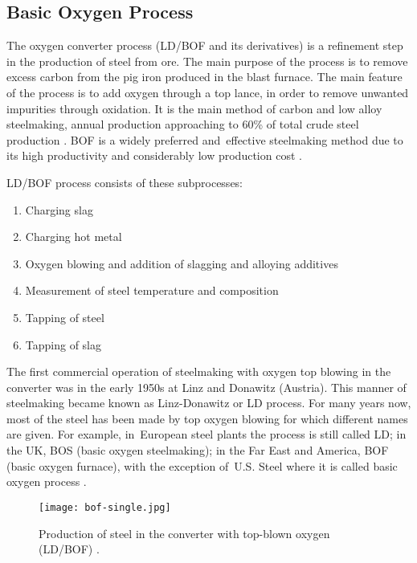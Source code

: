 \subsection{Basic Oxygen Process}

The oxygen converter process (LD/BOF and its derivatives) is a refinement step in the production of steel from ore. The main purpose of the process is to remove excess carbon from the pig iron produced in the blast furnace. The main feature of the process is to add oxygen through a top lance, in order to remove unwanted impurities through oxidation. It is the main method of carbon and low alloy steelmaking, annual production approaching to 60\% of total crude steel production \citep{Jalkanen2006}. BOF is a widely preferred and~effective steelmaking method due to its high productivity and considerably low production cost \citep{Wang2010}.

 LD/BOF process consists of these subprocesses:

\begin{enumerate}
	\item Charging slag
	\item Charging hot metal 
	\item Oxygen blowing and addition of slagging and alloying additives
	\item Measurement of steel temperature and composition
	\item Tapping of steel
	\item Tapping of slag
\end{enumerate}

The first commercial operation of steelmaking with oxygen top blowing in the converter was in the early 1950s at Linz and Donawitz (Austria). This manner of steelmaking became known as Linz-Donawitz or LD process. For many years now, most of the steel has been made by top oxygen blowing for which different names are given. For example, in~European steel plants the process is still called LD; in the UK, BOS (basic oxygen steelmaking); in the Far East and America, BOF (basic oxygen furnace), with the exception of~U.S. Steel where it is called basic oxygen process \citep{Turkdogan1996}.

\begin{figure}[h!]
	\centering
	\texttt{[image: bof-single.jpg]}
	\caption{Production of steel in the converter with top-blown oxygen (LD/BOF) \citep{Turkdogan1996}.}
	\label{o:1}
\end{figure}

